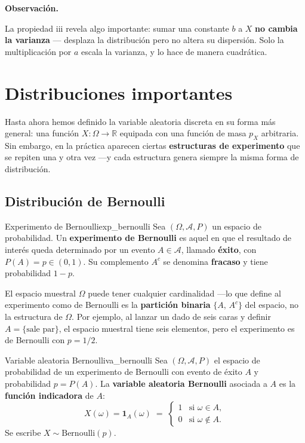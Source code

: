 \documentclass[12pt, a4paper]{book}
\newenvironment{observacion}{%
    \par\medskip\noindent\textbf{\color{azul}Observaci\'{o}n.}\enspace\itshape
}{\par\medskip}
\numberwithin{equation}{chapter}
\begin{document}
\begin{observacion}
	La propiedad iii revela algo importante: sumar una constante 
	$b$ a $X$ \textbf{no cambia la varianza} — desplaza la 
	distribución pero no altera su dispersión. Solo la 
	multiplicación por $a$ escala la varianza, y lo hace de manera 
	cuadrática.
\end{observacion}

\section{Distribuciones importantes}

Hasta ahora hemos definido la variable aleatoria discreta en su forma más
general: una función $X:\Omega\to\mathbb{R}$ equipada con una función de masa
$p_X$ arbitraria. Sin embargo, en la práctica aparecen ciertas
\textbf{estructuras de experimento} que se repiten una y otra vez ---y cada
estructura genera siempre la misma forma de distribución.

\subsection{Distribuci\'{o}n de Bernoulli}

\begin{definicion}{Experimento de Bernoulli}{exp_bernoulli}
	Sea $(\Omega, \mathcal{A}, P)$ un espacio de probabilidad. Un
	\textbf{experimento de Bernoulli} es aquel en que el resultado de
	interés queda determinado por un evento $A \in \mathcal{A}$,
	llamado \textbf{éxito}, con $P(A) = p \in (0,1)$. Su complemento
	$A^c$ se denomina \textbf{fracaso} y tiene probabilidad $1-p$.
\end{definicion}

El espacio muestral $\Omega$ puede tener cualquier cardinalidad ---lo que
define al experimento como de Bernoulli es la \textbf{partición binaria}
$\{A,\, A^c\}$ del espacio, no la estructura de $\Omega$. Por ejemplo,
al lanzar un dado de seis caras y definir $A = \{\text{sale par}\}$, el
espacio muestral tiene seis elementos, pero el experimento es de Bernoulli
con $p = 1/2$.

\begin{definicion}{Variable aleatoria Bernoulli}{va_bernoulli}
	Sea $(\Omega, \mathcal{A}, P)$ el espacio de probabilidad de un
	experimento de Bernoulli con evento de éxito $A$ y probabilidad
	$p = P(A)$. La \textbf{variable aleatoria Bernoulli} asociada a $A$
	es la \textbf{función indicadora} de $A$:
	\[
	X(\omega) = \mathbf{1}_A(\omega) \;=\;
	\begin{cases}
		1 & \text{si } \omega \in A, \\
		0 & \text{si } \omega \notin A.
	\end{cases}
	\]
	Se escribe $X \sim \mathrm{Bernoulli}(p)$.
\end{definicion}
\end{document}
